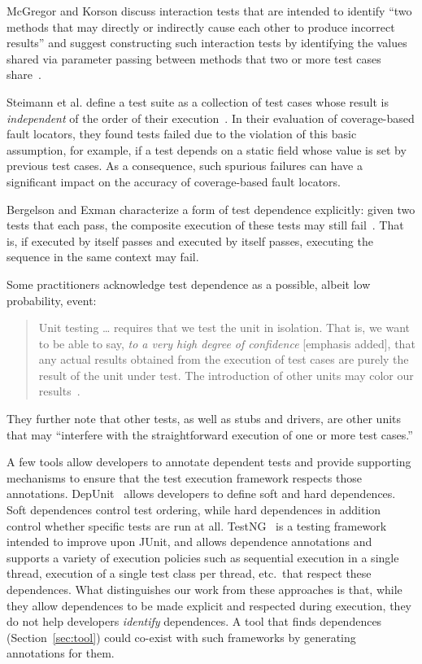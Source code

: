 McGregor and Korson discuss interaction tests that
are intended to identify ``two methods that may directly or indirectly
cause each other to produce incorrect results'' and suggest constructing such
interaction tests by identifying the values shared via parameter passing
between methods
 that two or more test cases share~\cite[p~.69]{mcgregoretal:CACM:1994}.

Steimann et al. define a test suite as a collection of test cases
whose result is \textit{independent} of the order of their execution~\cite{Steimann:2013}.
In their evaluation of coverage-based fault locators, they found
tests failed due to the violation of this basic assumption,
for example, if a test depends on a static field whose value is
set by previous test cases.  As a consequence, such spurious 
failures can have a significant impact on the accuracy
of coverage-based fault locators.


Bergelson and Exman characterize a form of test dependence
explicitly: given two tests that each pass, the composite
execution of these tests may still
fail~\cite[p.~38]{bergelsonetal:EEE:2006}.  That is, if 
 executed by itself passes and  executed by itself passes,
executing the sequence  in the same context may fail.

Some practitioners acknowledge test dependence as a possible, albeit low probability, event:
\begin{quote}
Unit testing \dots  
requires that we test the unit in isolation. That is, we
want to be able to say, \emph{to a very high degree of confidence\/} [emphasis added], that
any actual results obtained from the execution of test cases are
purely the result of the unit under test. The introduction of
other units may color our results~\cite{unit-test-def}.
\end{quote}
They further note that other tests, as well as stubs and drivers, are
other units that may ``interfere with the straightforward
execution of one or more test cases.''

A few tools allow developers to annotate dependent tests and
provide supporting mechanisms to ensure that the test execution framework
respects those annotations.  DepUnit~\cite{depunit}
allows developers to define soft and hard dependences. Soft dependences control
test ordering, while hard dependences in addition control whether specific tests are
run at all.  TestNG~\cite{testng} is a testing framework intended to improve upon JUnit,
and allows dependence annotations and supports a variety of execution policies such as sequential execution
in a single thread, execution of a single test class per thread, etc.\
that respect these dependences.
What distinguishes our work from these approaches is that, while they allow dependences
to be made explicit and respected during execution, they do not help developers
\emph{identify} dependences.  A tool that finds dependences (Section~\ref{sec:tool}) could co-exist
with such frameworks by generating annotations for them.



